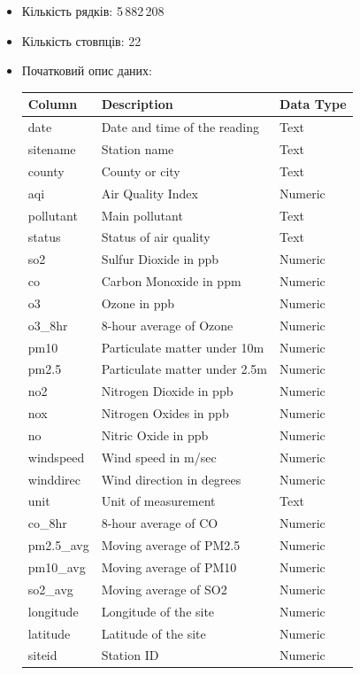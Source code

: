 \documentclass{article}
\begin{document}
\begin{itemize}
    \item Кількість рядків: 5\,882\,208
    \item Кількість стовпців: 22
    \item Початковий опис даних: 
    \begin{table}[h!]
\centering
\begin{tabular}{|>{\raggedright\arraybackslash}p{3cm}|p{5cm}|p{3cm}|}
\hline
\textbf{Column} & \textbf{Description} & \textbf{Data Type} \\
\hline
date & Date and time of the reading & Text \\
\hline
sitename & Station name & Text \\
\hline
county & County or city & Text \\
\hline
aqi & Air Quality Index & Numeric \\
\hline
pollutant & Main pollutant & Text \\
\hline
status & Status of air quality & Text \\
\hline
so2 & Sulfur Dioxide in ppb & Numeric \\
\hline
co & Carbon Monoxide in ppm & Numeric \\
\hline
o3 & Ozone in ppb & Numeric \\
\hline
o3\_8hr & 8-hour average of Ozone & Numeric \\
\hline
pm10 & Particulate matter under 10m & Numeric \\
\hline
pm2.5 & Particulate matter under 2.5m & Numeric \\
\hline
no2 & Nitrogen Dioxide in ppb & Numeric \\
\hline
nox & Nitrogen Oxides in ppb & Numeric \\
\hline
no & Nitric Oxide in ppb & Numeric \\
\hline
windspeed & Wind speed in m/sec & Numeric \\
\hline
winddirec & Wind direction in degrees & Numeric \\
\hline
unit & Unit of measurement & Text \\
\hline
co\_8hr & 8-hour average of CO & Numeric \\
\hline
pm2.5\_avg & Moving average of PM2.5 & Numeric \\
\hline
pm10\_avg & Moving average of PM10 & Numeric \\
\hline
so2\_avg & Moving average of SO2 & Numeric \\
\hline
longitude & Longitude of the site & Numeric \\
\hline
latitude & Latitude of the site & Numeric \\
\hline
siteid & Station ID & Numeric \\
\hline
\end{tabular}
\label{tab:data_columns}
\end{table}
\end{itemize}
\end{document}
